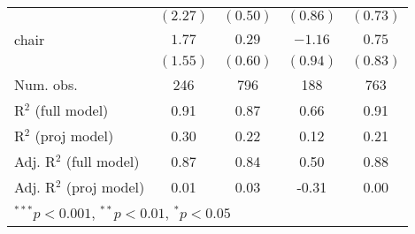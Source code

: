 \documentclass[12pt]{article}
\begin{document}
\begin{table}
\begin{center}
\begin{tabular}{l c c c c }
			& $(2.27)$      & $(0.50)$     & $(0.86)$ & $(0.73)$      \\
			chair                   & $1.77$        & $0.29$       & $-1.16$  & $0.75$        \\
			& $(1.55)$      & $(0.60)$     & $(0.94)$ & $(0.83)$      \\
			\hline
			Num. obs.               & 246           & 796          & 188      & 763           \\
			R$^2$ (full model)      & 0.91          & 0.87         & 0.66     & 0.91          \\
			R$^2$ (proj model)      & 0.30          & 0.22         & 0.12     & 0.21          \\
			Adj. R$^2$ (full model) & 0.87          & 0.84         & 0.50     & 0.88          \\
			Adj. R$^2$ (proj model) & 0.01          & 0.03         & -0.31    & 0.00          \\
			\hline
			\multicolumn{5}{l}{\scriptsize{$^{***}p<0.001$, $^{**}p<0.01$, $^*p<0.05$}}
		\end{tabular}
	\end{center}
\end{table}
\end{document}
